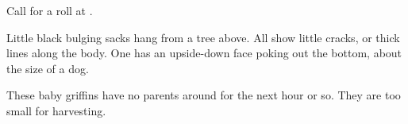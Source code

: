 
Call for a  roll at \tn[7].

\begin{boxtext}
	Little black bulging sacks hang from a tree above.
	All  show little cracks, or thick lines along the body.
	One has an upside-down face poking out the bottom, about the size of a dog.
\end{boxtext}

These baby \glspl{griffin} have no parents around for the next hour or so.
They are too small for \gls{harvesting}.
